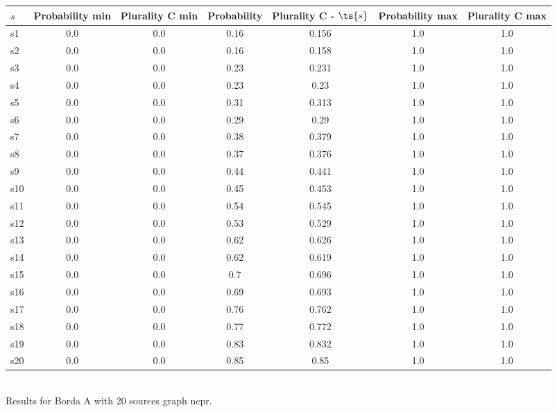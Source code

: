 \documentclass{article}
\begin{document}
\noindent\begin{tabular}{|l|c|c|c|c|c|c|}
\hline
$s$& Probability min & Plurality C min & Probability & Plurality C - $\ts{s}$ & Probability max & Plurality C max\\
\hline
s1 &0.0 & 0.0 & 0.16 & 0.156 & 1.0 & 1.0\\
\hline
s2 &0.0 & 0.0 & 0.16 & 0.158 & 1.0 & 1.0\\
\hline
s3 &0.0 & 0.0 & 0.23 & 0.231 & 1.0 & 1.0\\
\hline
s4 &0.0 & 0.0 & 0.23 & 0.23 & 1.0 & 1.0\\
\hline
s5 &0.0 & 0.0 & 0.31 & 0.313 & 1.0 & 1.0\\
\hline
s6 &0.0 & 0.0 & 0.29 & 0.29 & 1.0 & 1.0\\
\hline
s7 &0.0 & 0.0 & 0.38 & 0.379 & 1.0 & 1.0\\
\hline
s8 &0.0 & 0.0 & 0.37 & 0.376 & 1.0 & 1.0\\
\hline
s9 &0.0 & 0.0 & 0.44 & 0.441 & 1.0 & 1.0\\
\hline
s10 &0.0 & 0.0 & 0.45 & 0.453 & 1.0 & 1.0\\
\hline
s11 &0.0 & 0.0 & 0.54 & 0.545 & 1.0 & 1.0\\
\hline
s12 &0.0 & 0.0 & 0.53 & 0.529 & 1.0 & 1.0\\
\hline
s13 &0.0 & 0.0 & 0.62 & 0.626 & 1.0 & 1.0\\
\hline
s14 &0.0 & 0.0 & 0.62 & 0.619 & 1.0 & 1.0\\
\hline
s15 &0.0 & 0.0 & 0.7 & 0.696 & 1.0 & 1.0\\
\hline
s16 &0.0 & 0.0 & 0.69 & 0.693 & 1.0 & 1.0\\
\hline
s17 &0.0 & 0.0 & 0.76 & 0.762 & 1.0 & 1.0\\
\hline
s18 &0.0 & 0.0 & 0.77 & 0.772 & 1.0 & 1.0\\
\hline
s19 &0.0 & 0.0 & 0.83 & 0.832 & 1.0 & 1.0\\
\hline
s20 &0.0 & 0.0 & 0.85 & 0.85 & 1.0 & 1.0\\
\hline
\end{tabular}\\

\noindent Results for Borda A with 20 sources graph ncpr.
\end{document}
